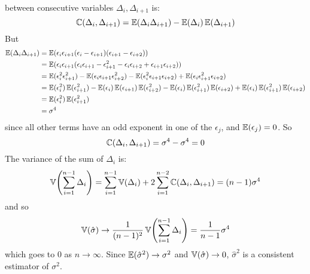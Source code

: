 between consecutive variables \(\Delta_{i}, \Delta_{i+1}\) is:
\[
\operatorname{\mathbb{C}}(\Delta_{i}, \Delta_{i+1}) = \operatorname{\mathbb{E}}(\Delta_{i} \Delta_{i+1}) - \operatorname{\mathbb{E}}(\Delta_{i}) \operatorname{\mathbb{E}}(\Delta_{i+1})
\]
But
\begin{align*}
\operatorname{\mathbb{E}}(\Delta_{i} \Delta_{i+1}) &= \operatorname{\mathbb{E}}(\epsilon_{i} \epsilon_{i+1} (\epsilon_{i} - \epsilon_{i+1}) (\epsilon_{i+1} - \epsilon_{i+2})) \\
&= \operatorname{\mathbb{E}}(\epsilon_{i} \epsilon_{i+1} (\epsilon_{i} \epsilon_{i+1} - \epsilon_{i+1}^{2} - \epsilon_{i} \epsilon_{i+2} + \epsilon_{i+1} \epsilon_{i+2}) ) \\
&= \operatorname{\mathbb{E}}(\epsilon_{i}^{2} \epsilon_{i+1}^{2}) - \operatorname{\mathbb{E}}(\epsilon_{i} \epsilon_{i+1} \epsilon_{i+2}^{2}) - \operatorname{\mathbb{E}}(\epsilon_{i}^{2} \epsilon_{i+1} \epsilon_{i+2}) + \operatorname{\mathbb{E}}(\epsilon_{i} \epsilon_{i+1}^{2} \epsilon_{i+2}) \\
&= \operatorname{\mathbb{E}}(\epsilon_{i}^{2}) \operatorname{\mathbb{E}}(\epsilon_{i+1}^{2}) - \operatorname{\mathbb{E}}(\epsilon_{i}) \operatorname{\mathbb{E}}(\epsilon_{i+1}) \operatorname{\mathbb{E}}(\epsilon_{i+2}^{2}) - \operatorname{\mathbb{E}}(\epsilon_{i}) \operatorname{\mathbb{E}}(\epsilon_{i+1}^{2}) \operatorname{\mathbb{E}}(\epsilon_{i+2}) + \operatorname{\mathbb{E}}(\epsilon_{i}) \operatorname{\mathbb{E}}(\epsilon_{i+1}^{2}) \operatorname{\mathbb{E}}(\epsilon_{i+2}) \\
&= \operatorname{\mathbb{E}}(\epsilon_{i}^{2}) \operatorname{\mathbb{E}}(\epsilon_{i+1}^{2}) \\
&= \sigma^{4}
\end{align*}
since all other terms have an odd exponent in one of the \(\epsilon_{j}\),
and \(\operatorname{\mathbb{E}}(\epsilon_{j}) = 0\). So
\[
\operatorname{\mathbb{C}}(\Delta_{i}, \Delta_{i+1}) = \sigma^{4} - \sigma^{4} = 0
\]
The variance of the sum of \(\Delta_{i}\) is:
\[
\VAR\left( \sum_{i=1}^{n-1} \Delta_{i} \right) = \sum_{i=1}^{n-1} \VAR(\Delta_{i}) + 2 \sum_{i=1}^{n-2} \COV(\Delta_{i}, \Delta_{i+1}) = (n-1) \sigma^{4}
\]
and so
\[
\VAR(\hat{\sigma}) \rightarrow \frac{1}{(n-1)^{2}} \VAR\left( \sum_{i=1}^{n-1} \Delta_{i} \right) = \frac{1}{n-1} \sigma^{4}
\]
which goes to 0 as \(n \rightarrow \infty\).
Since \(\operatorname{\mathbb{E}}(\hat{\sigma}^{2}) \rightarrow \sigma^{2}\) and
\(\operatorname{\mathbb{V}}(\hat{\sigma}) \rightarrow 0\), \(\hat{\sigma}^{2}\) is a
consistent estimator of \(\sigma^{2}\).
